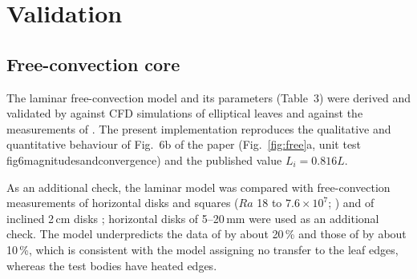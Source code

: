\documentclass[11pt,a4paper]{article}
\newcommand{\Ra}{\mathit{Ra}}
\newcommand{\codeus}{\char95\allowbreak}
\DeclareRobustCommand{\code}[1]{\textnormal{\ttfamily\let\_\codeus #1}}
\begin{document}
\section{Validation}\label{sec:validation}
\subsection{Free-convection core}
The laminar free-convection model and its parameters (Table~3) were derived and validated by \citet{graefe2022} against CFD simulations of elliptical leaves and against the measurements of \citet{hassani1989}. The present implementation reproduces the qualitative and quantitative behaviour of Fig.~6b of the paper (Fig.~\ref{fig:free}a, unit test \code{fig6\_magnitudes\_and\_convergence}) and the published value $L_i = 0.816L$.

As an additional check, the laminar model was compared with free-convection measurements of horizontal disks and squares ($\Ra$ 18 to \ensuremath{7.6\times10^{7}}; \citealp{hassani1989}) and of inclined 2\,cm disks \citep{kobus2002}; horizontal disks of 5--20\,mm \citep{kobus2001} were used as an additional check. The model underpredicts the data of \citet{hassani1989} by about 20\,\% and those of \citet{kobus2002} by about 10\,\%, which is consistent with the model assigning no transfer to the leaf edges, whereas the test bodies have heated edges.
\end{document}
